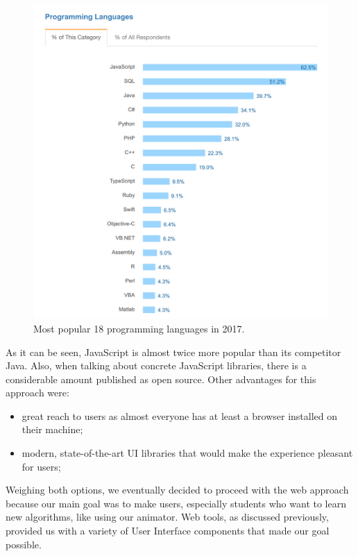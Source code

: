\documentclass{l4proj}
\begin{document}
\begin{figure}[!ht]
    \centering
    \includegraphics[scale=0.5]{stack-overflow-languages}
    \caption{Most popular 18 programming languages in 2017.}
    \label{fig:stack-overflow-languages}
\end{figure}

As it can be seen, JavaScript is almost twice more popular than its competitor Java. Also, when talking about concrete JavaScript libraries, there is a considerable amount published as open source. Other advantages for this approach were:

\begin{itemize}
    \item great reach to users as almost everyone has at least a browser installed on their machine;
    \item modern, state-of-the-art UI libraries that would make the experience pleasant for users;
\end{itemize}

Weighing both options, we eventually decided to proceed with the web approach because our main goal was to make users, especially students who want to learn new algorithms, like using our animator. Web tools, as discussed previously, provided us with a variety of User Interface components that made our goal possible.
\end{document}
